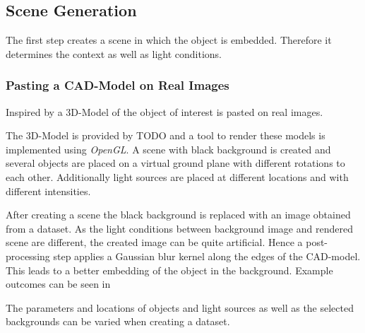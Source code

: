 \subsection{Scene Generation}
\label{sec:training:scene}

The first step creates a scene in which the object is embedded. Therefore it determines the context as well as light conditions.

\subsubsection{Pasting a CAD-Model on Real Images}

Inspired by \cite{Girshick2013, Peng, Rozantsev} a 3D-Model of the object of interest is pasted on real images.

The 3D-Model is provided by  TODO and a tool to render these models is implemented using \textit{OpenGL}. A scene with black background is created and several objects are placed on a virtual ground plane with different rotations to each other. Additionally light sources are placed at different locations and with different intensities. 

After creating a scene the black background is replaced with an image obtained from a dataset. As the light conditions between background image and rendered scene are different, the created image can be quite artificial. Hence a post-processing step applies a Gaussian blur kernel along the edges of the CAD-model. This leads to a better embedding of the object in the background. Example outcomes can be seen in 

The parameters and locations of objects and light sources as well as the selected backgrounds can be varied when creating a dataset.

